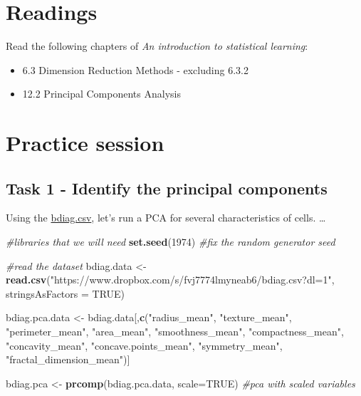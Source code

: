\documentclass[
]{book}
\newenvironment{Shaded}{\begin{snugshade}}{\end{snugshade}}
\newcommand{\AttributeTok}[1]{\textcolor[rgb]{0.13,0.29,0.53}{#1}}
\newcommand{\CommentTok}[1]{\textcolor[rgb]{0.56,0.35,0.01}{\textit{#1}}}
\newcommand{\ConstantTok}[1]{\textcolor[rgb]{0.56,0.35,0.01}{#1}}
\newcommand{\DecValTok}[1]{\textcolor[rgb]{0.00,0.00,0.81}{#1}}
\newcommand{\FunctionTok}[1]{\textcolor[rgb]{0.13,0.29,0.53}{\textbf{#1}}}
\newcommand{\NormalTok}[1]{#1}
\newcommand{\OtherTok}[1]{\textcolor[rgb]{0.56,0.35,0.01}{#1}}
\newcommand{\StringTok}[1]{\textcolor[rgb]{0.31,0.60,0.02}{#1}}
\providecommand{\tightlist}{%
  \setlength{\itemsep}{0pt}\setlength{\parskip}{0pt}}
\begin{document}
\section{Readings}\label{PCA2}

Read the following chapters of \emph{An introduction to statistical learning}:

\begin{itemize}
\tightlist
\item
  6.3 Dimension Reduction Methods - excluding 6.3.2
\item
  12.2 Principal Components Analysis
\end{itemize}

\section{Practice session}\label{PCA3}

\subsection*{Task 1 - Identify the principal components}\label{task-1---identify-the-principal-components}

Using the \href{https://www.dropbox.com/s/vp44yozebx5xgok/bdiag.csv?dl=1}{bdiag.csv}, let's run a PCA for several characteristics of cells.
\ldots{}

\begin{Shaded}
\begin{Highlighting}[]
\CommentTok{\#libraries that we will need}
\FunctionTok{set.seed}\NormalTok{(}\DecValTok{1974}\NormalTok{) }\CommentTok{\#fix the random generator seed }
\end{Highlighting}
\end{Shaded}

\begin{Shaded}
\begin{Highlighting}[]
\CommentTok{\#read the dataset}
\NormalTok{bdiag.data }\OtherTok{\textless{}{-}} \FunctionTok{read.csv}\NormalTok{(}\StringTok{"https://www.dropbox.com/s/fvj7774lmyneab6/bdiag.csv?dl=1"}\NormalTok{, }
           \AttributeTok{stringsAsFactors =} \ConstantTok{TRUE}\NormalTok{)}

\NormalTok{bdiag.pca.data }\OtherTok{\textless{}{-}}\NormalTok{ bdiag.data[,}\FunctionTok{c}\NormalTok{(}\StringTok{"radius\_mean"}\NormalTok{, }\StringTok{"texture\_mean"}\NormalTok{, }
\StringTok{"perimeter\_mean"}\NormalTok{, }\StringTok{"area\_mean"}\NormalTok{, }\StringTok{"smoothness\_mean"}\NormalTok{, }\StringTok{"compactness\_mean"}\NormalTok{, }
\StringTok{"concavity\_mean"}\NormalTok{, }\StringTok{"concave.points\_mean"}\NormalTok{, }\StringTok{"symmetry\_mean"}\NormalTok{, }\StringTok{"fractal\_dimension\_mean"}\NormalTok{)]}

\NormalTok{bdiag.pca }\OtherTok{\textless{}{-}} \FunctionTok{prcomp}\NormalTok{(bdiag.pca.data, }\AttributeTok{scale=}\ConstantTok{TRUE}\NormalTok{) }\CommentTok{\#pca with scaled variables}
\end{Highlighting}
\end{Shaded}
\end{document}

